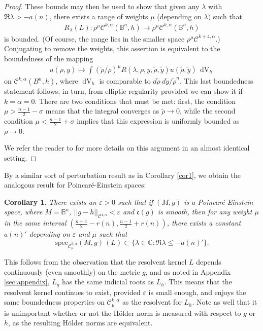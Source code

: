 \documentclass[10pt,reqno]{amsart}
\newtheorem{cor}[theorem]{Corollary}
\newcommand{\vep}{\varepsilon}
\DeclareMathOperator{\dvol}{dV}
\begin{document}
\begin{proof}
These bounds may then be used to show that given any $\lambda$ with $\Re \lambda > -a(n)$, there exists a range of weights $\mu$ (depending on $\lambda)$
such that 
\begin{align*}
R_{\lambda}(L): \rho^{\mu} \mathcal C^{k,\alpha}(\mathbb{B}^n, h) \to \rho^{\mu} \mathcal C^{k,\alpha}(\mathbb{B}^n, h) 
\end{align*}
is bounded.   (Of course, the range lies in the smaller space $\rho^{\mu} \mathcal C^{k+4,\alpha}$.)    Conjugating to remove the weights, this assertion is equivalent to the 
boundedness of the mapping
\begin{align*}
u(\rho, y) \longmapsto \int (\tilde{\rho}/\rho)^{\mu} R(\lambda, \rho, y, \tilde{\rho}, \tilde{y})  u(\tilde{\rho}, \tilde{y}) \, \dvol_h
\end{align*}
on $\mathcal C^{k,\alpha}(B^n, h)$, where $\dvol_h$ is comparable to $d\tilde{\rho} \ d\tilde{y}/\tilde{\rho}^{n}$.  This last boundedness statement follows, in turn, from
elliptic regularity provided we can show it if $k = \alpha = 0$.   There are two conditions that must be met: first, the condition $\mu > \frac{n-1}{2} - \sigma$ 
means that the integral converges as $\tilde{\rho} \to 0$, while the second condition $\mu < \frac{n-1}{2} + \sigma$ implies that this expression is uniformly
bounded as $\rho \to 0$. 

We refer the reader to \cite{BGIM2} for more details on this argument in an almost identical  setting. 
\end{proof}

By a similar sort of perturbation result as in Corollary \ref{cor1}, we obtain the analogous result for Poincar\'e-Einstein spaces: 
\begin{cor}
There exists an $\vep > 0$ such that if $(M,g)$ is a Poincar\'e-Einstein space, where $M = \mathbb{B}^n$, $||g-h||_{\mathcal C^{4,\alpha}} < \vep$ and $\mathfrak c(g)$ is smooth, then for any weight $\mu$ in the same interval $(\frac{n-1}{2} - r(n), \frac{n-1}{2} + r(n))$,
there exists a constant $a(n)'$ depending on $\vep$ and $\mu$ such that 
\[
\mathrm{spec}_{\mathcal C^{k,\alpha}_\mu} (M,g) \, (L) \subset \{ \lambda \in \mathbb C:  \Re \lambda \leq -a(n)' \}.
\]
\label{cor2}
\end{cor}
This follows from the observation that the resolvent kernel $L$ depends continuously (even smoothly) on the metric $g$, and as noted in Appendix \ref{sec:appendix}, $L_g$ has the same indicial roots as $L_h$.
This means that the resolvent kernel continues to exist, provided $\vep$ is small enough, and enjoys the same boundedness properties on $\mathcal C^{k,\alpha}_{\mu}$ as the resolvent for $L_h$.  Note as well that it is unimportant whether or not the H\"older norm is measured with respect to $g$ or $h$, as the resulting H\"older norms are equivalent.
\end{document}

